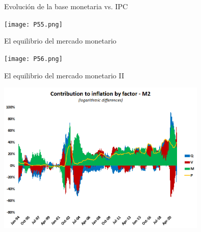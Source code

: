 \documentclass{beamer}
\begin{document}

\begin{frame}{Evolución de la base monetaria vs. IPC}

\centering\texttt{[image: P55.png]}\

\end{frame}


\begin{frame}{El equilibrio del mercado monetario}

\centering\texttt{[image: P56.png]}\

\end{frame}


\begin{frame}{El equilibrio del mercado monetario II}

\centering\includegraphics[width=10cm]{inflation contribution by factor.png}\

\end{frame}





\end{document}
